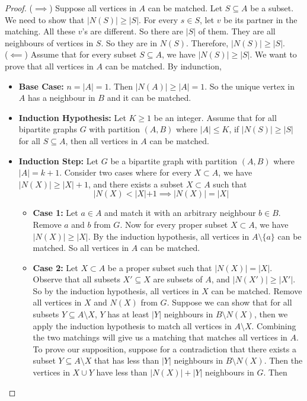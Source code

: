 \documentclass[openany]{report}
\begin{document}
\begin{proof}
    ($\implies$) Suppose all vertices in $A$ can be matched. Let $S \subseteq A$ be a subset. We need to show that $|N(S)| \geq |S|$. For every $s \in S$, let $v$ be its partner in the matching. All these $v$'s are different. So there are $|S|$ of them. They are all neighbours of vertices in $S$. So they are in $N(S)$. Therefore, $|N(S)| \geq |S|$.\\[2ex]
    ($\impliedby$) Assume that for every subset $S \subseteq A$, we have $|N(S)| \geq |S|$. We want to prove that all vertices in $A$ can be matched. By indunction, 
    \begin{itemize}
        \item \textbf{Base Case: } $n = |A| = 1$. Then $|N(A)| \geq |A| = 1$. So the unique vertex in $A$ has a neighbour in $B$ and it can be matched.
        \item \textbf{Induction Hypothesis:} Let $K \geq 1$ be an integer. Assume that for all bipartite graphs $G$ with partition $(A,B)$ where $|A| \leq K$, if $|N(S)| \geq |S|$ for all $S \subseteq A$, then all vertices in $A$ can be matched.
        \item \textbf{Induction Step:} Let $G$ be a bipartite graph with partition $(A,B)$ where $|A| = k+1$. Consider two cases where for every $X \subset A$, we have $|N(X)| \geq |X| +1$, and there exists a subset $X \subset A$ such that 
        \[|N(X) < |X| +1 \implies |N(X)| = |X|\]
        \begin{itemize}
            \item \textbf{Case 1:} Let $a \in A$ and match it with an arbitrary neighbour $b \in B$. Remove $a$ and $b$ from $G$. Now for every proper subset $X \subset A$, we have $|N(X)| \geq |X|$. By the induction hypothesis, all vertices in $A \setminus \{a\}$ can be matched. So all vertices in $A$ can be matched.
            \item \textbf{Case 2:} Let $X \subset A$ be a proper subset such that $|N(X)| = |X|$. Observe that all subsets $X' \subseteq X$ are subsets of $A$, and $|N(X')| \geq |X'|$. So by the induction hypothesis, all vertices in $X$ can be matched. Remove all vertices in $X$ and $N(X)$ from $G$. Suppose we can show that for all subsets $Y \subseteq A \setminus X$, $Y$ has at least $|Y|$ neighbours in $B \setminus N(X)$, then we apply the induction hypothesis to match all vertices in $A \setminus X$. Combining the two matchings will give us a matching that matches all vertices in $A$. To prove our supposition, suppose for a contradiction that there exists a subset $Y \subseteq A \setminus X$ that has less than $|Y|$ neighbours in $B \setminus N(X)$. Then the vertices in $X \cup Y$ have less than $|N(X)| + |Y|$ neighbours in $G$. Then

\end{itemize}
\end{itemize}
\end{proof}
\end{document}
